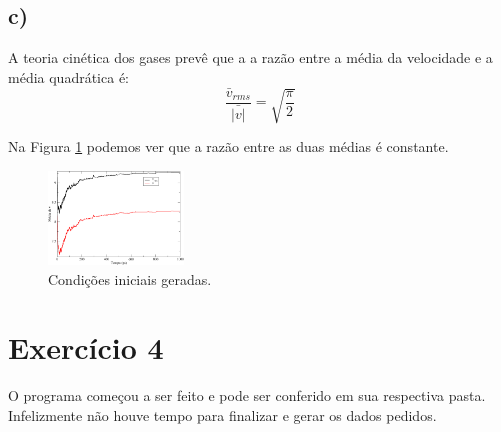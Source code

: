 \documentclass[a4wide]{report}
\begin{document}
\subsection*{c)}
A teoria cinética dos gases prevê que a a razão entre a média da velocidade e a média quadrática é:
\begin{equation}
\frac{\bar{v}_{rms}}{\bar{|v|}} = \sqrt{\frac{\pi}{2}}
\end{equation}

Na Figura \ref{3c} podemos ver que a razão entre as duas médias é constante.

\begin{figure}[!htb]
\centering
\includegraphics[width=0.32\textwidth]{medias.pdf}
\caption{Condições iniciais geradas.}
\label{3c}
\end{figure}

\section*{Exercício 4}

O programa começou a ser feito e pode ser conferido em sua respectiva pasta. Infelizmente não houve tempo para finalizar e gerar os dados pedidos.
\end{document}
